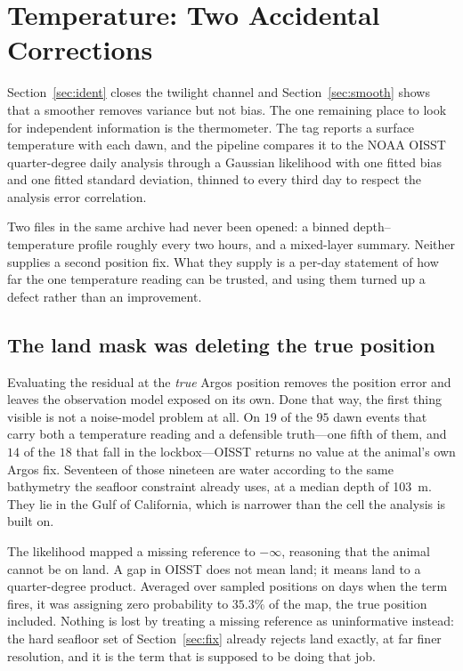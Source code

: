 \documentclass[conference]{IEEEtran}
\begin{document}
\section{Temperature: Two Accidental Corrections}
\label{sec:sst}

Section~\ref{sec:ident} closes the twilight channel and Section~\ref{sec:smooth}
shows that a smoother removes variance but not bias. The one remaining place to
look for independent information is the thermometer. The tag reports a surface
temperature with each dawn, and the pipeline compares it to the NOAA OISST
quarter-degree daily analysis through a Gaussian likelihood with one fitted bias
and one fitted standard deviation, thinned to every third day to respect the
analysis error correlation.

Two files in the same archive had never been opened: a binned depth--temperature
profile roughly every two hours, and a mixed-layer summary. Neither supplies a
second position fix. What they supply is a per-day statement of how far the one
temperature reading can be trusted, and using them turned up a defect rather
than an improvement.

\subsection{The land mask was deleting the true position}

Evaluating the residual at the \emph{true} Argos position removes the position
error and leaves the observation model exposed on its own. Done that way, the
first thing visible is not a noise-model problem at all. On $19$ of the $95$ dawn
events that carry both a temperature reading and a defensible truth---one fifth
of them, and $14$ of the $18$ that fall in the lockbox---OISST returns no value
at the animal's own Argos fix. Seventeen of those nineteen are water according to
the same bathymetry the seafloor constraint already uses, at a median depth of
\SI{103}{\metre}. They lie in the Gulf of California, which is narrower than the
cell the analysis is built on.

The likelihood mapped a missing reference to $-\infty$, reasoning that the animal
cannot be on land. A gap in OISST does not mean land; it means land to a
quarter-degree product. Averaged over sampled positions on days when the term
fires, it was assigning zero probability to $35.3\%$ of the map, the true
position included. Nothing is lost by treating a missing reference as
uninformative instead: the hard seafloor set of Section~\ref{sec:fix} already
rejects land exactly, at far finer resolution, and it is the term that is
supposed to be doing that job.
\end{document}

